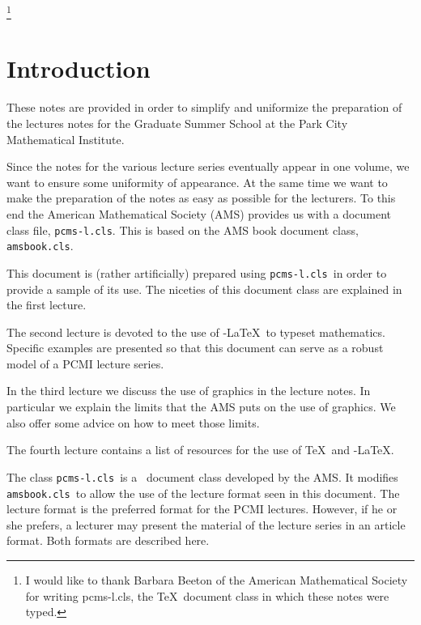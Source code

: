\documentclass[lectures, draft]{pcms-l}
\theoremstyle{plain}
\theoremstyle{definition}
\theoremstyle{remark}
\numberwithin{equation}{chapter}
\newcommand\pcms{\texttt{pcms-l.cls}}
\newcommand\amsbook{\texttt{amsbook.cls}}
\begin{document}
\frontmatter
\tableofcontents

\mainmatter



\address{Department of Mathematics, MS 136, Rice University, PO Box
  1892, Houston, TX 77251} 


\thanks{I would like to thank Barbara Beeton of the American
  Mathematical Society for writing pcms-l.cls, the \TeX\ document class in
  which these notes were typed.}


\section*{Introduction}
These notes are provided in order to simplify and uniformize the
preparation of the lectures notes for the Graduate Summer School at
the Park City Mathematical Institute.  

Since the notes for the various lecture series eventually appear in
one volume, we want to ensure some uniformity of appearance.  At the
same time we want to make the preparation of the notes as easy as
possible for the lecturers.  To this end the American Mathematical
Society (AMS) provides us with a document class file, \pcms.  This is
based on the AMS book document class, \amsbook.

This document is (rather artificially) prepared using \pcms\ in order
to provide a sample of its use.  The niceties of this document class
are explained in the first lecture.

The second lecture is devoted to the use of \AmS-\LaTeX\ to typeset
mathematics.  Specific examples are presented so that this document
can serve as a robust model of a PCMI lecture series.

In the third lecture we discuss the use of graphics in the lecture
notes.  In particular we explain the limits that the AMS puts on the
use of graphics.  We also offer some advice on how to meet those
limits.

The fourth lecture contains a list of resources for the use of \TeX\
and \AmS-\LaTeX.


The class \pcms\ is a \LaTeXe\ document class developed by the AMS\@.
It modifies \amsbook\ to allow the use of the lecture format seen in
this document.  The lecture format is the preferred format for the
PCMI lectures.  However, if he or she prefers, a lecturer may present
the material of the lecture series in an article format.  Both formats
are described here.
\end{document}
